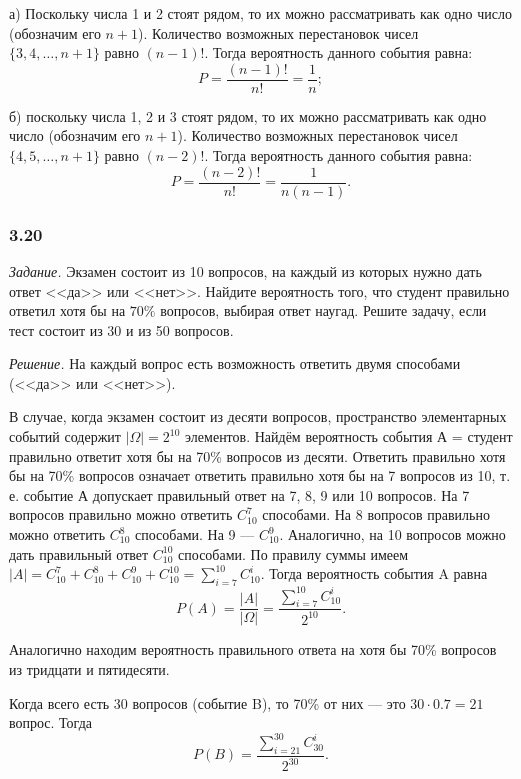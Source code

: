 \documentclass{book}
\begin{document}
а) Поскольку числа 1 и 2 стоят рядом, то их можно рассматривать как одно число (обозначим его $ n + 1 $).
Количество возможных перестановок чисел $ \{ 3, 4,  \dotsc , n + 1 \} $ равно $ \left( n - 1 \right)! $.
Тогда вероятность данного события равна:
$$ P =
\frac{ \left( n - 1 \right)! }{ n! } =
\frac{1}{n};$$

б) поскольку числа 1, 2 и 3 стоят рядом, то их можно рассматривать как одно число (обозначим его $ n + 1 $).
Количество возможных перестановок чисел $ \{ 4, 5,  \dotsc , n + 1 \} $ равно $ \left( n - 2 \right)! $.
Тогда вероятность данного события равна:
$$ P = \frac{ \left( n - 2 \right)!}{ n! } =
\frac{1}{ n (n - 1 ) }.$$

\subsubsection*{3.20}

\textit{Задание.} Экзамен состоит из 10 вопросов, на каждый из которых нужно дать ответ <<да>> или <<нет>>.
Найдите вероятность того, что студент правильно ответил хотя бы на $ 70 \% $ вопросов, выбирая ответ наугад.
Решите задачу, если тест состоит из 30 и из 50 вопросов.

\textit{Решение.} На каждый вопрос есть возможность ответить двумя способами (<<да>> или <<нет>>).

В случае, когда экзамен состоит из десяти вопросов, пространство элементарных событий содержит $ | \Omega | = 2^{10} $ элементов.
Найдём вероятность события А = {студент правильно ответит хотя бы на 70\% вопросов из десяти}.
Ответить правильно хотя бы на 70\% вопросов означает ответить правильно хотя бы на 7 вопросов из 10, т. е. событие А допускает правильный ответ на 7, 8, 9 или 10 вопросов.
На 7 вопросов правильно можно ответить $ C_{10}^7 $ способами.
На 8 вопросов правильно можно ответить $ C_{10}^8 $ способами.
На 9 --- $ C_{10}^9 $.
Аналогично, на 10 вопросов можно дать правильный ответ $ C_{10}^{10} $ способами.
По правилу суммы имеем $ |A| = C_{10}^7 + C_{10}^8 + C_{10}^9 + C_{10}^{10} = \sum \limits_{i=7}^{10} C_{10}^i $.
Тогда вероятность события A равна
$$ P \left( A \right) =
\frac{|A|}{| \Omega |} =
\frac{ \sum \limits_{i=7}^{10} C_{10}^i}{2^{10}}.$$

Аналогично находим вероятность правильного ответа на хотя бы 70\% вопросов из тридцати и пятидесяти.

Когда всего есть 30 вопросов (событие B), то 70\% от них --- это $ 30 \cdot 0.7 = 21$ вопрос.
Тогда
$$ P \left( B \right) =
\frac{ \sum \limits_{i=21}^{30} C_{30}^i}{2^{30}}.$$
\end{document}
